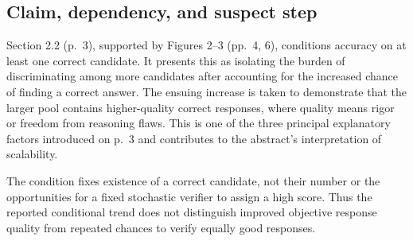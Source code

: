 \documentclass[10pt]{article}
\begin{document}
\subsection*{Claim, dependency, and suspect step}
Section 2.2 (p. 3), supported by Figures 2–3 (pp. 4, 6), conditions accuracy on at least one correct candidate. It presents this as isolating the burden of discriminating among more candidates after accounting for the increased chance of finding a correct answer. The ensuing increase is taken to demonstrate that the larger pool contains higher-quality correct responses, where quality means rigor or freedom from reasoning flaws. This is one of the three principal explanatory factors introduced on p. 3 and contributes to the abstract’s interpretation of scalability.\par
The condition fixes existence of a correct candidate, not their number or the opportunities for a fixed stochastic verifier to assign a high score. Thus the reported conditional trend does not distinguish improved objective response quality from repeated chances to verify equally good responses.\par
\end{document}
